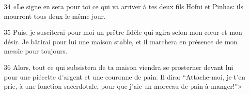 
34 «Le signe en sera pour toi ce qui va arriver à tes deux fils Hofni et Pinhas: ils mourront tous deux le même jour.

35 Puis, je susciterai pour moi un prêtre fidèle qui agira selon mon cœur et mon désir. Je bâtirai pour lui une maison stable, et il marchera en présence de mon messie pour toujours.

36 Alors, tout ce qui subsistera de ta maison viendra se prosterner devant lui pour une piécette d’argent et une couronne de pain. Il dira: “Attache-moi, je t’en prie, à une fonction sacerdotale, pour que j’aie un morceau de pain à manger!”»